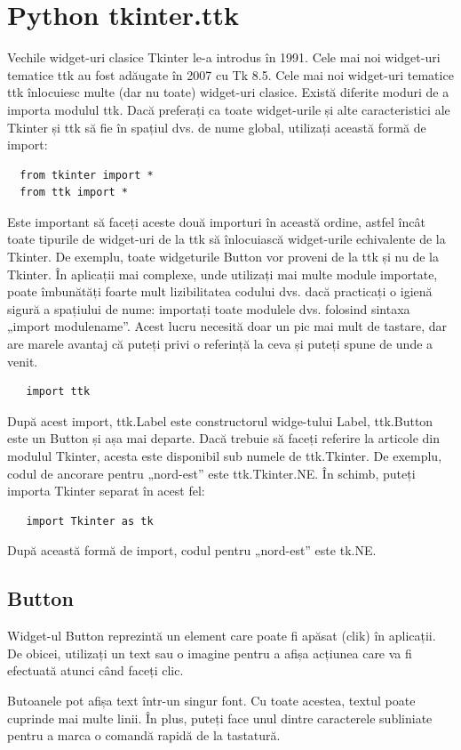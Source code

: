 \documentclass[12pt,a4paper]{book}
\begin{document}
\section{Python tkinter.ttk}
Vechile widget-uri clasice Tkinter le-a introdus în 1991.
Cele mai noi widget-uri tematice ttk au fost adăugate în 2007 cu Tk 8.5.  Cele mai noi widget-uri tematice ttk înlocuiesc multe (dar nu toate) widget-uri clasice.
Există diferite moduri de a importa modulul ttk. Dacă preferați ca toate widget-urile și alte caracteristici ale Tkinter și ttk să fie în spațiul dvs. de nume global, utilizați această formă de import:
\begin{verbatim}
  from tkinter import *
  from ttk import *
\end{verbatim}
	Este important să faceți aceste două importuri în această ordine, astfel încât toate tipurile de widget-uri de la ttk să înlocuiască widget-urile echivalente de la Tkinter.  De exemplu, toate widgeturile Button vor proveni de la ttk și nu de la Tkinter.
    În aplicații mai complexe, unde utilizați mai multe module importate, poate îmbunătăți foarte mult lizibilitatea codului dvs. dacă practicați o igienă sigură a spațiului de nume: importați toate modulele dvs. folosind sintaxa „import modulename”.  Acest lucru necesită doar un pic mai mult de tastare, dar are marele avantaj că puteți privi o referință la ceva și puteți spune de unde a venit.
\begin{verbatim}
   import ttk
\end{verbatim}
 	După acest import, ttk.Label este constructorul widge-tului Label, ttk.Button este un Button și așa mai departe.
Dacă trebuie să faceți referire la articole din modulul Tkinter, acesta este disponibil sub numele de ttk.Tkinter.  De exemplu, codul de ancorare pentru „nord-est” este ttk.Tkinter.NE.
În schimb, puteți importa Tkinter separat în acest fel:
\begin{verbatim}
   import Tkinter as tk
\end{verbatim}
     După această formă de import, codul pentru „nord-est” este tk.NE.
     
\subsection{Button}
Widget-ul Button reprezintă un element care poate fi apăsat (clik) în aplicații.  De obicei, utilizați un text sau o imagine pentru a afișa acțiunea care va fi efectuată atunci când faceți clic.

	Butoanele pot afișa text într-un singur font.  Cu toate acestea, textul poate cuprinde mai multe linii.  În plus, puteți face unul dintre caracterele subliniate pentru a marca o comandă rapidă de la tastatură.
\end{document}
